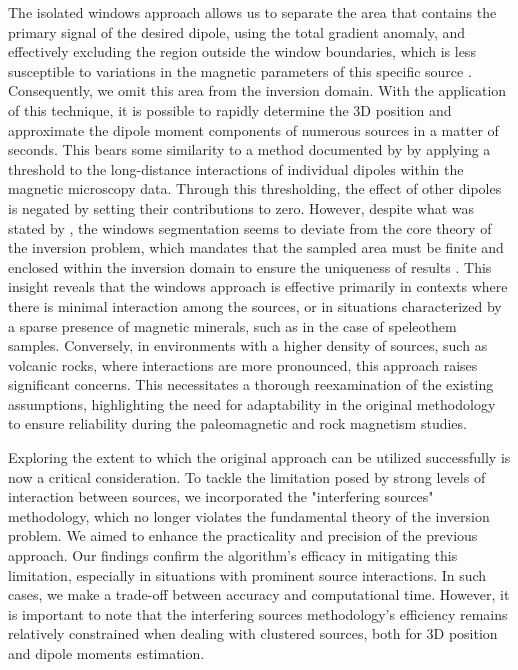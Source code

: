 The isolated windows approach allows us to separate the area that contains the primary signal of the desired dipole, using the total gradient anomaly, and effectively excluding the region outside the window boundaries, which is less susceptible to variations in the magnetic parameters of this specific source \citep{Souza-Junior2023b}. Consequently, we omit this area from the inversion domain. With the application of this technique, it is possible to rapidly determine the 3D position and approximate the dipole moment components of numerous sources in a matter of seconds. This bears some similarity to a method documented by \cite{Weiss2007} by applying a threshold to the long-distance interactions of individual dipoles within the magnetic microscopy data. Through this thresholding, the effect of other dipoles is negated by setting their contributions to zero. However, despite what was stated by \cite{Souza-Junior2023b}, the windows segmentation seems to deviate from the core theory of the inversion problem, which mandates that the sampled area must be finite and enclosed within the inversion domain to ensure the uniqueness of results \citep{Baratchart2013, Lima2013}. This insight reveals that the windows approach is effective primarily in contexts where there is minimal interaction among the sources, or in situations characterized by a sparse presence of magnetic minerals, such as in the case of speleothem samples. Conversely, in environments with a higher density of sources, such as volcanic rocks, where interactions are more pronounced, this approach raises significant concerns. This necessitates a thorough reexamination of the existing assumptions, highlighting the need for adaptability in the original methodology to ensure reliability during the paleomagnetic and rock magnetism studies.

Exploring the extent to which the original approach can be utilized successfully is now a critical consideration. To tackle the limitation posed by strong levels of interaction between sources, we incorporated the "interfering sources" methodology, which no longer violates the fundamental theory of the inversion problem. We aimed to enhance the practicality and precision of the previous approach. Our findings confirm the algorithm's efficacy in mitigating this limitation, especially in situations with prominent source interactions. In such cases, we make a trade-off between accuracy and computational time. However, it is important to note that the interfering sources methodology's efficiency remains relatively constrained when dealing with clustered sources, both for 3D position and dipole moments estimation.

